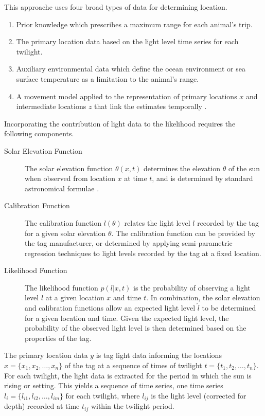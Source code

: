 \documentclass[10pt]{article}
\begin{document}
This approache uses four broad types of data for determining location. 
\begin{enumerate}
\item Prior knowledge which prescribes a maximum range for each animal's
trip. 
\item  The primary location data based on the light level time
series for each twilight. 
\item Auxiliary environmental data which define the ocean environment
  or sea surface temperature as a limitation to the animal's range.
\item A movement model applied to the representation of primary
  locations $x$ and intermediate locations $z$ that link the estimates
  temporally \cite{sumner2009}.
\end{enumerate}

Incorporating the contribution of light data to the likelihood requires
the following components.

\begin{description}
\item[Solar Elevation Function]The solar elevation function $\theta(x,
  t)$ determines the elevation $\theta$ of the sun when observed from
  location $x$ at time $t$, and is determined by standard astronomical
  formulae \cite{M91}.
\item[Calibration Function]The calibration function $l(\theta)$
  relates the light level $l$ recorded by the tag for a given solar
  elevation $\theta$. The calibration function can be provided by the
  tag manufacturer, or determined by applying semi-parametric
  regression techniques to light levels recorded by the tag at a fixed
  location.
\item[Likelihood Function]The likelihood function $p(l|x,t)$
  is the probability of observing a light level $l$ at a given
  location $x$ and time $t$. In combination, the solar elevation and
  calibration functions allow an expected light level $\hat{l}$ to be
  determined for a given location and time. Given the expected light
  level, the probability of the observed light level is then
  determined based on the properties of the tag.
\end{description}

The primary location data $y$ is tag light data informing the
locations $x=\{x_{1},x_{2},\ldots,x_{n}\}$ of the tag at a sequence of
times of twilight $t=\{t_{1},t_{2},\ldots,t_{n}\}$.  For each
twilight, the light data is extracted for the period in which the sun
is rising or setting. This yields a sequence of time series, one time
series $l_{i}=\{l_{i1},l_{i2},\ldots,l_{im}\}$ for each twilight,
where $l_{ij}$ is the light level (corrected for depth) recorded at
time $t_{ij}$ within the twilight period.
\end{document}
